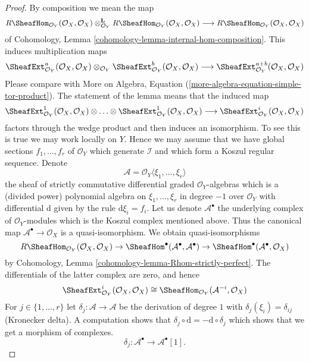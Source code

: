 \begin{proof}
By composition we mean the map
$$
R\SheafHom_{\mathcal{O}_Y}(\mathcal{O}_X, \mathcal{O}_X)
\otimes_{\mathcal{O}_Y}^\mathbf{L}
R\SheafHom_{\mathcal{O}_Y}(\mathcal{O}_X, \mathcal{O}_X)
\longrightarrow
R\SheafHom_{\mathcal{O}_Y}(\mathcal{O}_X, \mathcal{O}_X)
$$
of Cohomology, Lemma \ref{cohomology-lemma-internal-hom-composition}.
This induces multiplication maps
$$
\SheafExt^a_{\mathcal{O}_Y}(\mathcal{O}_X, \mathcal{O}_X)
\otimes_{\mathcal{O}_Y}
\SheafExt^b_{\mathcal{O}_Y}(\mathcal{O}_X, \mathcal{O}_X)
\longrightarrow
\SheafExt^{a + b}_{\mathcal{O}_Y}(\mathcal{O}_X, \mathcal{O}_X)
$$
Please compare with
More on Algebra, Equation (\ref{more-algebra-equation-simple-tor-product}).
The statement of the lemma means that the induced map
$$
\SheafExt^1_{\mathcal{O}_Y}(\mathcal{O}_X, \mathcal{O}_X)
\otimes \ldots \otimes
\SheafExt^1_{\mathcal{O}_Y}(\mathcal{O}_X, \mathcal{O}_X)
\longrightarrow
\SheafExt^i_{\mathcal{O}_Y}(\mathcal{O}_X, \mathcal{O}_X)
$$
factors through the wedge product and then induces an isomorphism.
To see this is true we may work locally on $Y$. Hence we may assume
that we have global sections $f_1, \ldots, f_r$ of $\mathcal{O}_Y$
which generate $\mathcal{I}$ and which form a Koszul regular sequence.
Denote
$$
\mathcal{A} = \mathcal{O}_Y\langle \xi_1, \ldots, \xi_r\rangle
$$
the sheaf of strictly commutative differential graded $\mathcal{O}_Y$-algebras
which is a (divided power) polynomial algebra on
$\xi_1, \ldots, \xi_r$ in degree $-1$ over $\mathcal{O}_Y$
with differential $\text{d}$ given by the rule $\text{d}\xi_i = f_i$.
Let us denote $\mathcal{A}^\bullet$ the underlying
complex of $\mathcal{O}_Y$-modules which is the Koszul complex
mentioned above. Thus the canonical map
$\mathcal{A}^\bullet \to \mathcal{O}_X$
is a quasi-isomorphism. We obtain quasi-isomorphisms
$$
R\SheafHom_{\mathcal{O}_Y}(\mathcal{O}_X, \mathcal{O}_X) \to
\SheafHom^\bullet(\mathcal{A}^\bullet, \mathcal{A}^\bullet) \to
\SheafHom^\bullet(\mathcal{A}^\bullet, \mathcal{O}_X)
$$
by Cohomology, Lemma \ref{cohomology-lemma-Rhom-strictly-perfect}.
The differentials of the latter complex are zero, and hence
$$
\SheafExt^i_{\mathcal{O}_Y}(\mathcal{O}_X, \mathcal{O}_X)
\cong \SheafHom_{\mathcal{O}_Y}(\mathcal{A}^{-i}, \mathcal{O}_X)
$$
For $j \in \{1, \ldots, r\}$ let $\delta_j : \mathcal{A} \to \mathcal{A}$
be the derivation of degree $1$ with $\delta_j(\xi_i) = \delta_{ij}$
(Kronecker delta). A computation shows that
$\delta_j \circ \text{d} = - \text{d} \circ \delta_j$ which shows that
we get a morphism of complexes.
$$
\delta_j : \mathcal{A}^\bullet \to \mathcal{A}^\bullet[1].
$$
\end{proof}
